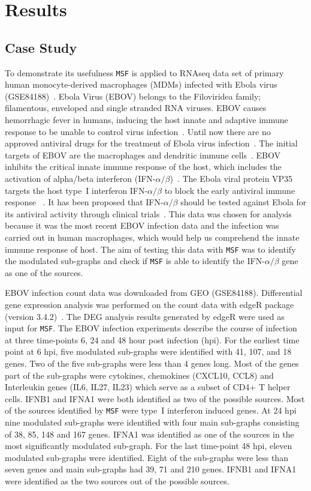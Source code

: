 \documentclass[10pt,a4paper,twocolumn]{article}
\begin{document}
\section*{Results}

\subsection*{Case Study}

To demonstrate its usefulness \texttt{MSF} is applied to RNAseq data
set of primary human monocyte-derived macrophages (MDMs) infected with
Ebola virus (GSE84188)~\cite{Olejnik}. Ebola Virus (EBOV) belongs to
the Filoviridea family; filamentous, enveloped and single stranded RNA
viruses. EBOV causes hemorrhagic fever in humans, inducing the host
innate and adaptive immune response to be unable to control virus
infection~\cite{Prins}. Until now there are no approved antiviral
drugs for the treatment of Ebola virus infection~\cite{Konde,Rhein}.
The initial targets of EBOV are the macrophages and dendritic immune
cells~\cite{Falasca,Rhein}. EBOV inhibits the critical innate immune
response of the host, which includes the activation of alpha/beta
interferon (IFN-$\alpha / \beta$)~\cite{Prins,Konde,Cardenas}. The
Ebola viral protein VP35 targets the host type~I interferon
IFN-$\alpha / \beta$ to block the early antiviral immune response
~\cite{Prins,Konde,Falasca,Cardenas,Olejnik}. It has been proposed
that IFN-$\alpha / \beta$ should be tested against Ebola for its
antiviral activity through clinical trials~\cite{Konde}. This data was chosen for analysis because it was the most recent EBOV infection data and the infection was carried out in human macrophages, which would help us comprehend the innate immune response of host. The aim of
testing this data with \texttt{MSF} was to identify the
modulated sub-graphs and check if \texttt{MSF} is able to identify the
IFN-$\alpha / \beta$ gene as one of the sources.

EBOV infection count data was downloaded from GEO
(GSE84188). Differential gene expression analysis was performed on the
count data with edgeR package (version 3.4.2)~\cite{edgeR}. The DEG
analysis results generated by edgeR were used as input for \texttt{MSF}. The
EBOV infection experiments describe the course of infection at three time-points 6, 24 and 48 hour post
infection (hpi). For the earliest time point at 6 hpi, five modulated sub-graphs were
identified with 41, 107, and 18 genes. Two of the five sub-graphs were less than 4 genes long. Most of the genes part of the sub-graphs were cytokines, chemokines
(CXCL10, CCL8) and Interleukin genes (IL6, IL27, IL23) which serve as
a subset of CD4+ T helper cells. IFNB1 and IFNA1 were both identified
as two of the possible sources. Most of the sources identified by
\texttt{MSF} were type~I interferon induced genes. At 24 hpi nine
modulated sub-graphs were identified with four main sub-graphs consisting of 38, 85, 148 and 167 genes. IFNA1 was identified as one of
the sources in the most significantly modulated sub-graph. For the last time-point 48 hpi, eleven modulated sub-graphs were identified. Eight of the sub-graphs were less than seven genes and main sub-graphs had 39, 71 and 210 genes. IFNB1 and IFNA1 were
identified as the two sources out of the possible sources.
\end{document}

